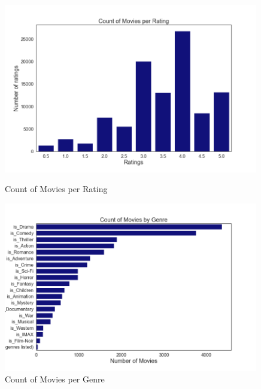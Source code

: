 \documentclass[12pt]{article}
\numberwithin{equation}{section}
\begin{document}
\begin{figure}[h!]
    \begin{minipage}[b]{0.49\linewidth}
         \centering
  	\includegraphics[width=0.99\textwidth]{count_rating.png}
  	\caption{Count of Movies per Rating}
  	\label{fig:count_ranking}
    \end{minipage}
    \hspace{0.01cm}
    \begin{minipage}[b]{0.49\linewidth}
        \centering
  	\includegraphics[width=0.99\textwidth]{count_genre.png}
  	\caption{Count of Movies per Genre}
  	\label{fig:count_genre}
    \end{minipage}
\end{figure}
\end{document}
